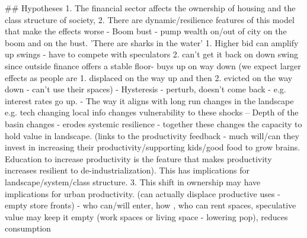 ## Hypotheses
1. The financial sector affects the ownership of housing and the class structure of society, 
2. There are dynamic/resilience features of this model that make the effects worse
- Boom bust - pump wealth on/out of city on the boom and on the bust. 'There are sharks in the water' 1. Higher bid can amplify up swings - have to compete with speculators 2. can't get it back on down swing since outside finance offers a stable floor- buys up on way down (we expect larger effects as people are 1. displaced on the way up and then 2. evicted on the way down - can't use their spaces)
- Hysteresis - perturb, doesn't come back - e.g. interest rates go up.
- The way it aligns with long run changes in the landscape e.g. tech changing local info changes vulnerability to these shocks -- Depth of the basin changes - erodes systemic resilience - together these changes the capacity to hold value in landscape. (links to the productivity feedback - much will/can they invest in increasing their productivity/supporting kids/good food to grow brains. Education to increase productivity is the feature that makes productivity increases resilient to de-industrialization). This has implications for landscape/system/class structure.
3. This shift in ownership may have implications for urban productivity. (can actually displace productive uses - empty store fronts) - who can/will enter, how , who can rent spaces, speculative value may keep it empty (work spaces or living space - lowering pop), reduces consumption
